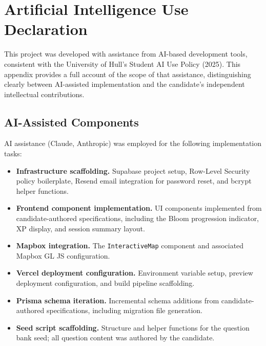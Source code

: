 \chapter{Artificial Intelligence Use Declaration}
\label{app:ai_declaration}

This project was developed with assistance from AI-based development tools,
consistent with the University of Hull's Student AI Use Policy (2025).
This appendix provides a full account of the scope of that assistance,
distinguishing clearly between AI-assisted implementation and the candidate's
independent intellectual contributions.

\section*{AI-Assisted Components}
\label{app:ai_assisted}

AI assistance (Claude, Anthropic) was employed for the following
implementation tasks:

\begin{itemize}[leftmargin=2em]
  \item \textbf{Infrastructure scaffolding.} Supabase project setup, Row-Level
    Security policy boilerplate, Resend email integration for password reset,
    and bcrypt helper functions.
  \item \textbf{Frontend component implementation.} UI components implemented
    from candidate-authored specifications, including the Bloom progression
    indicator, XP display, and session summary layout.
  \item \textbf{Mapbox integration.} The \texttt{InteractiveMap} component and
    associated Mapbox GL JS configuration.
  \item \textbf{Vercel deployment configuration.} Environment variable setup,
    preview deployment configuration, and build pipeline scaffolding.
  \item \textbf{Prisma schema iteration.} Incremental schema additions from
    candidate-authored specifications, including migration file generation.
  \item \textbf{Seed script scaffolding.} Structure and helper functions for
    the question bank seed; all question content was authored by the candidate.
\end{itemize}

